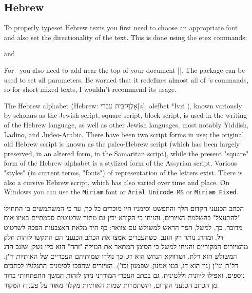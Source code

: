 \subsection{Hebrew}
\newfontfamily{}
To properly typeset Hebrew texts you first need to choose an appropriate font and also set the directionality of the text. This
is done using the etex commands:

\CMDI{\beginL} and \CMDI{\beginR} 

For \XeTeX\ you also need to add near the top of your document ||. The package  can be used to set all parameters. Be warned that it redefines almost all of \latexe's commands, so for short mixed texts, I wouldn't recommend its usage. 



The Hebrew alphabet (Hebrew: אָלֶף־בֵּית עִבְרִי[a], alefbet ʿIvri ), known variously by scholars as the Jewish script, square script, block script, is used in the writing of the Hebrew language, as well as other Jewish languages, most notably Yiddish, Ladino, and Judeo-Arabic. There have been two script forms in use; the original old Hebrew script is known as the paleo-Hebrew script (which has been largely preserved, in an altered form, in the Samaritan script), while the present "square" form of the Hebrew alphabet is a stylized form of the Assyrian script. Various "styles" (in current terms, "fonts") of representation of the letters exist. There is also a cursive Hebrew script, which has also varied over time and place. On Windows you can use the \texttt{Miriam} font or \texttt{Arial Unicode MS} or \texttt{Miriam Fixed}.
\medskip

\topline

\bgroup{}
\raggedleft\hebrew{}\beginR

הכתב הכנעני הקדום הלך והתפשט וסימניו היו מוכרים כל כך, עד כי המשתמשים בו התחילו "להתעצל" בהשלמת הציורים, והניחו כי הקורא יבין גם מתוך שרטוטים סכמתיים באיזו אות מדובר. כך, למשל, הפך הראש למשולש עם צוואר; כף היד מלאת האצבעות הפכה לשרטוט דל, ומהדג נותר רק הזנב. כשהעברים אמצו את הכתב הכנעני הם התקשו לזהות חלק מהציורים המקוריים והניחו למשל כי הסימן המתאר את המילה "זהה" הוא כלי נשק; שזנב הדג המשולש הוא דלת, ושדווקא הנחש הוא דג. כך נולדו שמותיהם העבריים של האותיות זי"ן, דל"ת ונו"ן (נון הוא דג, כמו אמנון, שפמנון וכו'). הציורים שהפכו לסימנים התגלגלו לכתבים נוספים, ואפילו ליוונית וללטינית. גם בכתב העברי המודרני ניתן לזהות המשך התפתחותי ברור מן הכתב הכנעני הקדום, והשתמרות שמות האותיות מקלה מאוד על פענוח המקור.



